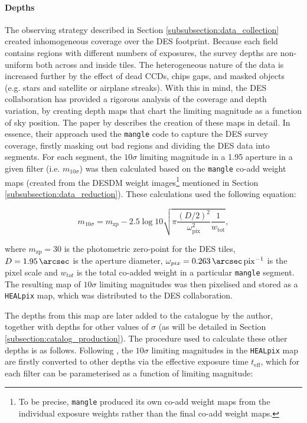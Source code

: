 \paragraph{Depths} The observing strategy described in Section \ref{subsubsection:data_collection} created inhomogeneous coverage over the DES footprint. Because each field contains regions with different numbers of exposures, the survey depths are non-uniform both across and inside tiles. The heterogeneous nature of the data is increased further by the effect of dead CCDs, chips gaps, and masked objects (e.g. stars and satellite or airplane streaks). With this in mind, the DES collaboration has provided a rigorous analysis of the coverage and depth variation, by creating depth maps that chart the limiting magnitude as a function of sky position. The paper by \cite{2018ApJS..235...33D} describes the creation of these maps in detail. In essence, their approach used the \texttt{mangle} code \citep{2004MNRAS.349..115H,2008MNRAS.387.1391S} to capture the DES survey coverage, firstly masking out bad regions and dividing the DES data into segments. For each segment, the $10\sigma$ limiting magnitude in a \SI{1.95}{\arcsec} aperture in a given filter (i.e. $m_{10\sigma}$) was then calculated based on the \texttt{mangle} co-add weight maps (created from the DESDM weight images\footnote{To be precise, \texttt{mangle} produced its own co-add weight maps from the individual exposure weights rather than the final co-add weight maps.} mentioned in Section \ref{subsubsection:data_reduction}). These calculations used the following equation:

\begin{equation}
m_{10\sigma} = m_{\mathrm{zp}} - 2.5 \log{10 \sqrt{\pi \frac{(D/2)^2}{\omega^2_{\mathrm{pix}}} \frac{1}{w_{\mathrm{tot}}}}},
\end{equation}

\noindent where $m_{\mathrm{zp}}=30$ is the photometric zero-point for the DES tiles, $D=\SI{1.95}{\arcsec}$ is the aperture diameter, $\omega_{pix} = \SI{0.263}{\arcsec.pix^{-1}}$ is the pixel scale and $w_{tot}$ is the total co-added weight in a particular \texttt{mangle} segment. The resulting map of $10 \sigma$ limiting magnitudes was then pixelised and stored as a \texttt{HEALpix} map, which was distributed to the DES collaboration.   \par


The depths from this map are later added to the \DESVIDEO catalogue by the author, together with depths for other values of $\sigma$ (as will be detailed in Section \ref{subsection:catalog_production}). The procedure used to calculate these other depths is as follows. Following \cite{2015arXiv150900870R}, the $10\sigma$ limiting magnitudes in the \texttt{HEALpix} map are firstly converted to other depths via the effective exposure time $t_{\mathrm{eff}}$, which for each filter can be parameterised as a function of limiting magnitude:

